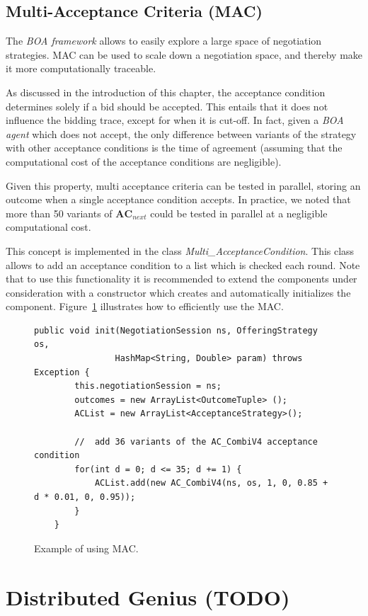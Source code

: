 \documentclass[]{article}
\begin{document}
\subsection{Multi-Acceptance Criteria (MAC)}
The \textit{BOA framework} allows to easily explore a large space of negotiation strategies. MAC can be used to scale down a negotiation space, and thereby make it more computationally traceable.

As discussed in the introduction of this chapter, the acceptance condition determines solely if a bid should be accepted. This entails that it does not influence the bidding trace, except for when it is cut-off. In fact, given a \textit{BOA agent} which does not accept, the only difference between variants of the strategy with other acceptance conditions is the time of agreement (assuming that the computational cost of the acceptance conditions are negligible).

Given this property, multi acceptance criteria can be tested in parallel, storing an outcome when a single acceptance condition accepts. In practice, we noted that more than 50 variants of $\textbf{AC}_{next}$ could be tested in parallel at a negligible computational cost.

This concept is implemented in the class \textit{Multi\_AcceptanceCondition}. This class allows to add an acceptance condition to a list which is checked each round. Note that to use this functionality it is recommended to extend the components under consideration with a constructor which creates and automatically initializes the component. Figure~\ref{code:mac} illustrates how to efficiently use the MAC.

\begin{figure}[h!]
\begin{lstlisting}[basicstyle=\small]
	public void init(NegotiationSession ns, OfferingStrategy os,
				HashMap<String, Double> param) throws Exception {
		this.negotiationSession = ns;
		outcomes = new ArrayList<OutcomeTuple> ();
		ACList = new ArrayList<AcceptanceStrategy>();
		
		//  add 36 variants of the AC_CombiV4 acceptance condition
		for(int d = 0; d <= 35; d += 1) {
			ACList.add(new AC_CombiV4(ns, os, 1, 0, 0.85 + d * 0.01, 0, 0.95));
		}	
	}
\end{lstlisting}
\caption{Example of using MAC.}\label{code:mac}
\end{figure}



\section{Distributed Genius (TODO)}
\end{document}
